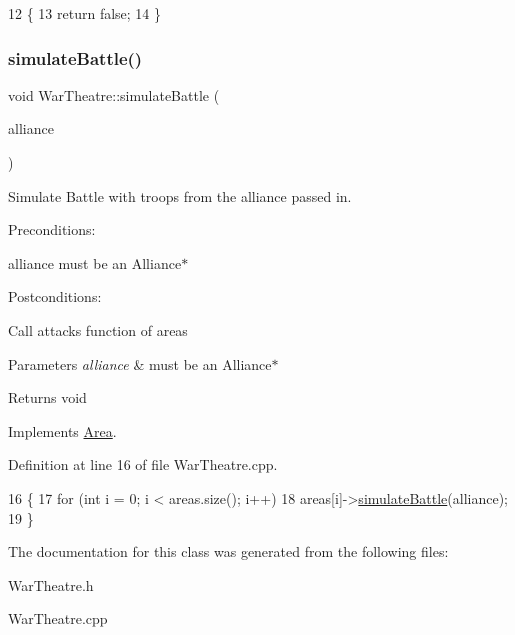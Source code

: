 \begin{DoxyCode}
12                             \{
13     \textcolor{keywordflow}{return} \textcolor{keyword}{false};
14 \}
\end{DoxyCode}
\mbox{\label{classWarTheatre_a2b3a98ad63087ab1f858ecbb5651253d}} 
\subsubsection{\texorpdfstring{simulate\+Battle()}{simulateBattle()}}
{\footnotesize\ttfamily void War\+Theatre\+::simulate\+Battle (\begin{DoxyParamCaption}\item[{Alliance $\ast$}]{alliance }\end{DoxyParamCaption})\hspace{0.3cm}{\ttfamily [virtual]}}



Simulate Battle with troops from the alliance passed in. 

Preconditions\+:
\begin{DoxyItemize}
\item alliance must be an Alliance$\ast$
\end{DoxyItemize}

Postconditions\+:
\begin{DoxyItemize}
\item Call attacks function of areas
\end{DoxyItemize}


\begin{DoxyParams}{Parameters}
{\em alliance} & must be an Alliance$\ast$ \\
\hline
\end{DoxyParams}
\begin{DoxyReturn}{Returns}
void 
\end{DoxyReturn}


Implements \hyperlink{classArea}{Area}.



Definition at line 16 of file War\+Theatre.\+cpp.


\begin{DoxyCode}
16                                                   \{
17     \textcolor{keywordflow}{for} (\textcolor{keywordtype}{int} i = 0; i < areas.size(); i++)
18         areas[i]->\hyperlink{classWarTheatre_a2b3a98ad63087ab1f858ecbb5651253d}{simulateBattle}(alliance);
19 \}
\end{DoxyCode}


The documentation for this class was generated from the following files\+:\begin{DoxyCompactItemize}
\item 
War\+Theatre.\+h\item 
War\+Theatre.\+cpp\end{DoxyCompactItemize}
